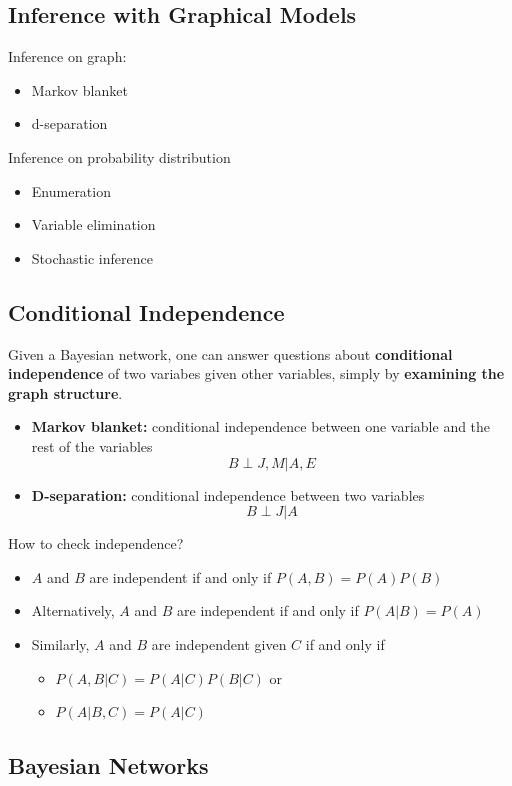 \documentclass[10pt]{article}
\begin{document}
\subsection*{Inference with Graphical Models}
Inference on graph:
\begin{itemize}
	\item Markov blanket
	\item d-separation
\end{itemize}
Inference on probability distribution
\begin{itemize}
	\item Enumeration
	\item Variable elimination
	\item Stochastic inference
\end{itemize}

\subsection*{Conditional Independence}
Given a Bayesian network, one can answer questions about \textbf{conditional independence} of two variabes given other variables, simply by \textbf{examining the graph structure}.
\begin{itemize}
	\item \textbf{Markov blanket:} conditional independence between one variable and the rest of the variables
	\[B \perp J, M | A, E\]
	\item \textbf{D-separation:} conditional independence between two variables
	\[B \perp J | A\]
\end{itemize}
How to check independence?
\begin{itemize}
	\item $A$ and $B$ are independent if and only if $P(A, B) = P(A) P(B)$
	\item Alternatively, $A$ and $B$ are independent if and only if $P(A | B) = P(A)$
	\item Similarly, $A$ and $B$ are independent given $C$ if and only if
	\begin{itemize}
	    \item $P(A, B|C) = P(A | C) P(B | C)$ or
	    \item $P(A | B, C) = P(A | C)$
    \end{itemize}
\end{itemize}

\subsection*{Bayesian Networks}
\end{document}
